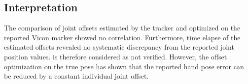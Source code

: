\FloatBarrier

\subsection{Interpretation}

The comparison of joint offsets estimated by the tracker and optimized on the reported Vicon marker showed no correlation. Furthermore, time elapse of the estimated offsets revealed no systematic discrepancy from the reported joint position values.  is therefore considered as not verified.
However, the offset optimization on the true pose has shown that the reported hand pose error can be reduced by a constant individual joint offset.
